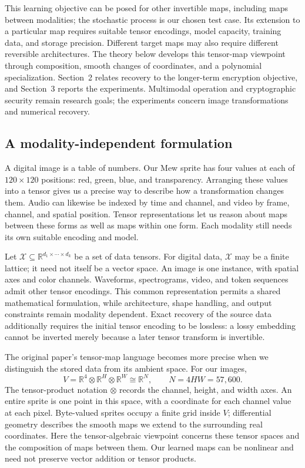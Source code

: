 \documentclass[10pt]{article}
\begin{document}
This learning objective can be posed for other invertible maps, including
maps between modalities; the stochastic process is our chosen test case.
Its extension to a particular map requires suitable tensor encodings, model
capacity, training data, and storage precision. Different target maps may also
require different reversible architectures.
The theory below develops this tensor-map viewpoint through composition,
smooth changes of coordinates, and a polynomial specialization. Section~2
relates recovery to the longer-term encryption objective, and Section~3 reports
the experiments. Multimodal operation and cryptographic security remain research
goals; the experiments concern image transformations and numerical recovery.

\subsection{A modality-independent formulation}
A digital image is a table of numbers. Our Mew sprite has four values at each
of $120\times120$ positions: red, green, blue, and transparency. Arranging these
values into a tensor gives us a precise way to describe how a transformation
changes them. Audio can likewise be indexed by time and channel, and video by
frame, channel, and spatial position. Tensor representations let us reason about
maps between these forms as well as maps within one form. Each modality still
needs its own suitable encoding and model.

Let $\mathcal X\subseteq\mathbb R^{d_1\times\cdots\times d_k}$ be a set of data
tensors. For digital data, $\mathcal X$ may be a finite lattice; it need not itself
be a vector space. An image is one instance, with spatial axes and color channels.
Waveforms, spectrograms, video, and token sequences admit other tensor encodings.
This common representation permits a shared mathematical formulation, while
architecture, shape handling, and output constraints remain modality dependent.
Exact recovery of the source data additionally requires the initial tensor
encoding to be lossless: a lossy embedding cannot be inverted merely because a
later tensor transform is invertible.

The original paper's tensor-map language \cite{original} becomes more precise
when we distinguish the stored data from its ambient space. For our images,
\begin{equation*}
 V=\mathbb R^4\otimes\mathbb R^H\otimes\mathbb R^W
 \cong\mathbb R^N,\qquad N=4HW=57{,}600.
\end{equation*}
The tensor-product notation $\otimes$ records the channel, height, and width
axes.
An entire sprite is one point in this space, with a coordinate for each channel
value at each pixel. Byte-valued sprites occupy a finite grid inside $V$;
differential geometry describes the smooth maps we extend to the surrounding
real coordinates. Here the tensor-algebraic viewpoint concerns these tensor
spaces and the composition of maps between them. Our learned maps can be
nonlinear and need not preserve vector addition or tensor products.
\end{document}
